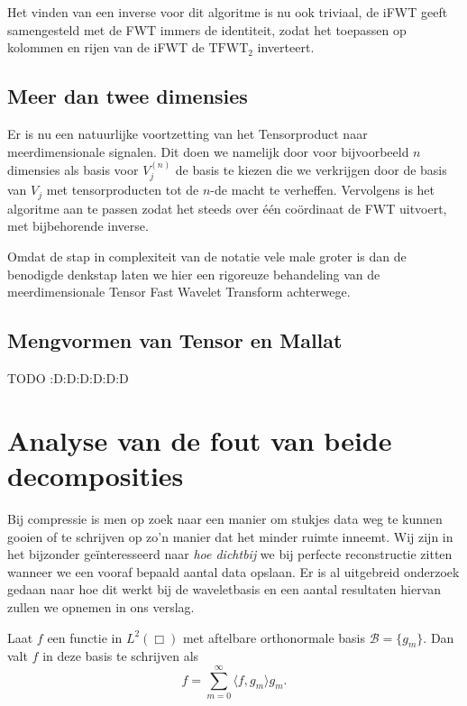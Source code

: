 Het vinden van een inverse voor dit algoritme is nu ook triviaal, de iFWT geeft samengesteld met de FWT
immers de identiteit, zodat het toepassen op kolommen en rijen van de iFWT de $\mathrm{TFWT}_2$ inverteert.

\subsection{Meer dan twee dimensies}
Er is nu een natuurlijke voortzetting van het Tensorproduct naar meerdimensionale signalen.
Dit doen we namelijk door voor bijvoorbeeld $n$ dimensies als basis voor $V^{(n)}_j$ de basis te kiezen die we verkrijgen 
door de basis van $V_j$ met tensorproducten tot de $n$-de macht te verheffen.
Vervolgens is het algoritme aan te passen zodat het steeds over \'e\'en co\"ordinaat de FWT uitvoert, 
met bijbehorende inverse.

Omdat de stap in complexiteit van de notatie vele male groter is dan de benodigde denkstap laten we hier een rigoreuze
behandeling van de meerdimensionale Tensor Fast Wavelet Transform achterwege.

\subsection{Mengvormen van Tensor en Mallat}

TODO :D:D:D:D:D:D

\section{Analyse van de fout van beide decomposities}
\label{daling_wavelet}

Bij compressie is men op zoek naar een manier om stukjes data weg te kunnen gooien of te schrijven op zo'n manier dat het minder ruimte inneemt. Wij zijn in het bijzonder ge\"interesseerd naar \emph{hoe dichtbij} we bij perfecte reconstructie zitten wanneer we een vooraf bepaald aantal data opslaan. Er is al uitgebreid onderzoek gedaan naar hoe dit werkt bij de waveletbasis en een aantal resultaten hiervan zullen we opnemen in ons verslag.

Laat $f$ een functie in $L^2(\Box)$ met aftelbare orthonormale basis $\mathcal{B} = \{ g_m \}$. Dan valt $f$ in deze basis te schrijven als
\[
f = \sum_{m = 0}^\infty \langle f, g_m \rangle g_m.
\]

